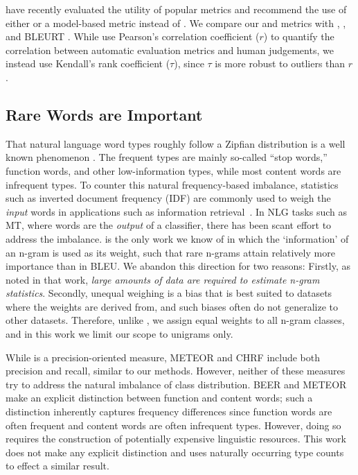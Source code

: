 \citet{mathur-etal-2020-tangled} have recently evaluated the utility of popular metrics and recommend the use of either  or a model-based metric instead of \bleu. 
We compare our  and  metrics with \bleu, , and BLEURT \cite{sellam-etal-2020-bleurt}. 
While \citet{mathur-etal-2020-tangled} use Pearson's correlation coefficient ($r$) to quantify the correlation between automatic evaluation metrics and human judgements, we instead use Kendall's rank coefficient ($\tau$), since $\tau$ is more robust to outliers than $r$ \cite{croux2010robust-correlation}. 

\subsection{Rare Words are Important}
\label{sec:rare-words}
That natural language word types roughly follow a Zipfian distribution is a well known phenomenon \cite{zipf1949human,powers-1998-zipf-apps}.
The frequent types are mainly so-called ``stop words,'' function words, and other low-information types, while most content words are infrequent types.
To counter this natural frequency-based imbalance, statistics such as inverted document frequency (IDF) are commonly used to weigh the \textit{input} words in applications such as information retrieval~\cite{Jones72specificity}.
In NLG tasks such as MT, where words are the \textit{output} of a classifier, there has been scant effort to address the imbalance.
\citet{doddington2002-nist} is the only work we know of in which the `information' of an n-gram is used as its weight, such that rare n-grams attain relatively more importance than in BLEU. 
We abandon this direction for two reasons:
Firstly, as noted in that work, \textit{large amounts of data are required to estimate n-gram statistics}.
Secondly, unequal weighing is a bias that is best suited to datasets where the weights are derived from, and such biases often do not generalize to other datasets.
Therefore, unlike \citet{doddington2002-nist}, we assign equal weights to all n-gram classes, and in this work we limit our scope to unigrams only.

While \bleu{} is a precision-oriented measure, METEOR \cite{banerjee-lavie-2005-meteor} and CHRF \cite{popovic-2015-chrf} include both precision and recall, similar to our methods.
However, neither of these measures try to address the natural imbalance of class distribution. 
BEER \cite{stanojevic-simaan-2014-beer} and METEOR \cite{denkowski-lavie-2011-meteor1.3} make an explicit distinction between function and content words; such a distinction inherently captures frequency differences since function words are often frequent and content words are often infrequent types. However, doing so requires the construction of potentially expensive linguistic resources. This work does not make any explicit  distinction and uses naturally occurring type counts to effect a similar result.

